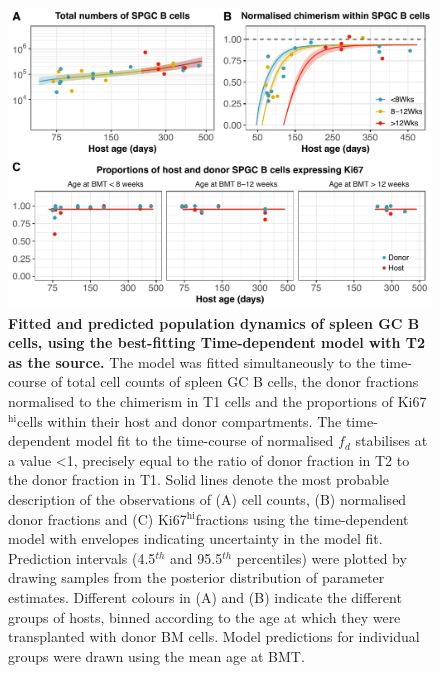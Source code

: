 \documentclass[11pt,onecolumn]{article}
\newcommand{\khi}{Ki67$^\text{hi}$}
\begin{document}
	\begin{figure}[h!]
		\centerline{\includegraphics[scale = 0.85] {Results_SPGC_T2.pdf}}
		\caption{\small \textbf{Fitted and predicted population dynamics of spleen GC B cells, using the best-fitting Time-dependent model with T2 as the source.}  The model was fitted simultaneously to the time-course of total cell counts of spleen GC B cells, the donor fractions normalised to the chimerism in T1 cells and the proportions of \khi cells within their host and donor compartments. The time-dependent model fit to the time-course of normalised $f_{d}$ stabilises at a value <1, precisely equal to the ratio of donor fraction in T2 to the donor fraction in T1. Solid lines denote the most probable description of the observations of (A) cell counts, (B) normalised donor fractions and (C) \khi fractions using the time-dependent model with envelopes indicating uncertainty in the model fit. Prediction intervals (4.5$^{th}$ and 95.5$^{th}$ percentiles) were plotted by drawing samples from the posterior distribution of parameter estimates. Different colours in (A) and (B) indicate the different groups of hosts, binned according to the age at which they were transplanted with donor BM cells. Model predictions for individual groups were drawn using the mean age at BMT.}
		\label{fig:results_SPGC}
	\end{figure}
    
\end{document}
